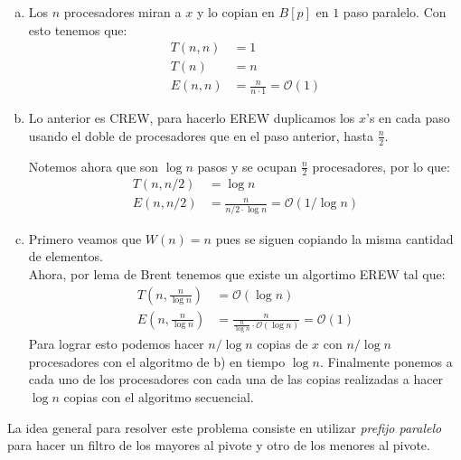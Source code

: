\documentclass[dcc,uchile]{fcfmcourse}
\theoremstyle{plain}
\theoremstyle{definition}
\begin{document}
\newpage
\begin{problems}
\problem
\begin{enumerate}[a)]
\item
Los $n$ procesadores miran a $x$ y lo copian en $B[p]$ en $1$ paso paralelo.
Con esto tenemos que:
\begin{align*}
    T(n,n) &= 1\\
	T(n) &= n\\
	E(n,n) &= \frac{n}{n\cdot 1} = \mathcal{O}(1)
\end{align*}
\item 
Lo anterior es CREW, para hacerlo EREW duplicamos los $x$'s en cada paso usando el doble de procesadores que en el paso anterior, hasta $\frac{n}{2}$.\\
\begin{algorithm}[H]

\SetAlgoLined
{}
\end{algorithm}
Notemos ahora que son $\log{n}$ pasos y se ocupan $\frac{n}{2}$ procesadores, por lo que:
\begin{align*}
T(n,n/2) &= \log{n}\\
E(n,n/2) &= \frac{n}{n/2\cdot \log{n}} = \mathcal{O}(1/\log{n})
\end{align*}
\item
Primero veamos que $W(n)=n$ pues se siguen copiando la misma cantidad de elementos.\\
Ahora, por lema de Brent tenemos que existe un algortimo EREW tal que:
\begin{align*}
T\left(n,\frac{n}{\log{n}}\right) &= \mathcal{O}(\log{n})\\
E\left(n,\frac{n}{\log{n}}\right) &= \frac{n}{\frac{n}{\log{n}}\cdot \mathcal{O}(\log{n})} = \mathcal{O}(1)
\end{align*}
Para lograr esto podemos hacer $n/\log{n}$ copias de $x$ con $n/\log{n}$ procesadores con el algoritmo de b) en tiempo $\log{n}$. Finalmente ponemos a cada uno de los procesadores con cada una de las copias realizadas a hacer $\log{n}$ copias con el algoritmo secuencial.
\end{enumerate}
\problem La idea general para resolver este problema consiste en utilizar \textit{prefijo paralelo} para hacer un filtro de los mayores al pivote y otro de los menores al pivote.\\


\end{problems}
\end{document}
